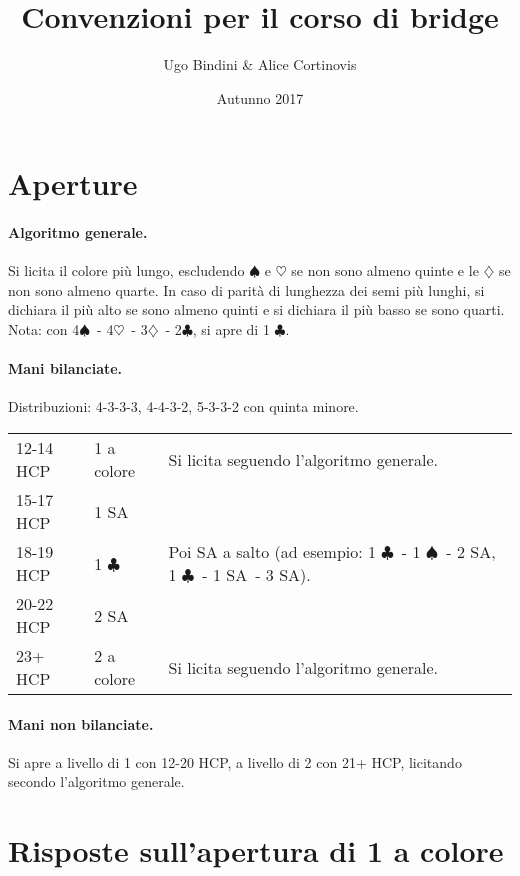 \documentclass[a4paper,10pt]{article}
\title{Convenzioni per il corso di bridge}
\author{Ugo Bindini \& Alice Cortinovis}
\date{Autunno 2017}
\renewcommand{\c}{$\clubsuit$\xspace}
\renewcommand{\d}{$\diamondsuit$\xspace}
\newcommand{\h}{$\heartsuit$\xspace}
\newcommand{\s}{$\spadesuit$\xspace}
\newcommand{\sa}{SA\xspace}
\newcommand{\smallspace}{\vskip0.3cm}
\newenvironment{threecol}
  {\smallspace\noindent\begin{tabular}{l l p{0.78\textwidth}}}
  {\end{tabular}\smallspace}
\begin{document}
\maketitle

\section{Aperture}

\paragraph{Algoritmo generale.}
Si licita il colore più lungo, escludendo \s e \h se non sono almeno quinte e le \d se non sono almeno quarte.
In caso di parità di lunghezza dei semi più lunghi, si dichiara il più alto se sono almeno quinti e si dichiara il più basso se sono quarti.
Nota: con 4\s\ - 4\h\ - 3\d\ - 2\c, si apre di 1 \c.

\paragraph{Mani bilanciate.} Distribuzioni: 4-3-3-3, 4-4-3-2, 5-3-3-2 con quinta minore.

\begin{threecol}
 12-14 HCP & 1 a colore & Si licita seguendo l'algoritmo generale.\\
 15-17 HCP & 1 \sa\\
 18-19 HCP & 1 \c & Poi \sa a salto (ad esempio: 1 \c\ - 1 \s\ - 2 \sa, 1 \c\ - 1 \sa\ - 3 \sa).\\
 20-22 HCP & 2 \sa\\
 23+ HCP & 2 a colore & Si licita seguendo l'algoritmo generale.
\end{threecol}

\paragraph{Mani non bilanciate.} Si apre a livello di 1 con 12-20 HCP, a livello di 2 con 21+ HCP, licitando secondo l'algoritmo generale.



\section{Risposte sull'apertura di 1 a colore}
\end{document}
